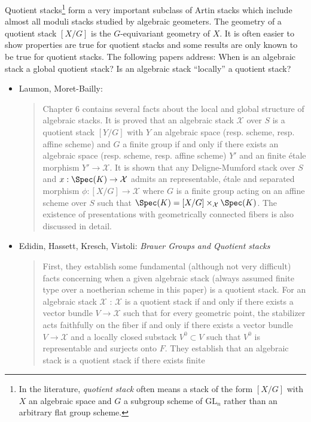 \noindent
Quotient stacks\footnote{In the literature,
\emph{quotient stack} often means a stack of the
form $[X/G]$ with $X$ an algebraic space and $G$ a subgroup scheme
of $\text{GL}_n$ rather than an arbitrary flat group scheme.}
form a very important subclass of Artin stacks which include almost all moduli
stacks studied by algebraic geometers. The geometry of a quotient stack
$[X/G]$ is the $G$-equivariant geometry of $X$. It is often easier to show
properties are true for quotient stacks and some results are only known to be
true for quotient stacks. The following papers address: When is an algebraic
stack a global quotient stack? Is an algebraic stack ``locally'' a quotient
stack?
\begin{itemize}
\item Laumon, Moret-Bailly: \cite[Chapter 6]{LM-B}
\begin{quote}
Chapter 6 contains several facts about the local and global structure of
algebraic stacks. It is proved that an algebraic stack $\mathcal{X}$ over $S$
is a
quotient stack $[Y/G]$ with $Y$ an algebraic space (resp. scheme, resp. affine
scheme) and $G$ a finite group if and only if there exists an algebraic space
(resp. scheme, resp. affine scheme) $Y'$ and an finite \'etale morphism $Y'
\to \mathcal{X}$. It is shown that any Deligne-Mumford stack over $S$ and
$x : \Spec(K) \to \mathcal{X}$ admits an representable, \'etale and
separated morphism $\phi : [X/G] \to \mathcal{X}$ where $G$ is a finite group
acting on an affine scheme over $S$ such
that $\Spec(K) = [X/G] \times_\mathcal{X} \Spec(K)$.
The existence of presentations
with geometrically connected fibers is also discussed in detail.
\end{quote}
\item
Edidin, Hassett, Kresch, Vistoli:
\emph{Brauer Groups and Quotient stacks} \cite{ehkv}
\begin{quote}
First, they establish some fundamental (although not very difficult)
facts concerning
when a given algebraic stack (always assumed finite type over a noetherian
scheme in this paper) is a quotient stack. For an algebraic stack
$\mathcal{X}$ : $\mathcal{X}$ is a quotient stack if and only if
there exists a vector bundle $V \to \mathcal{X}$ such that for every
geometric point, the stabilizer acts faithfully on the fiber
if and only if there exists a vector bundle $V \to \mathcal{X}$ and
a locally closed substack
$V^0 \subset V$ such that $V^0$ is representable and surjects onto $F$. They
establish that an algebraic stack is a quotient stack if there exists finite

\end{quote}
\end{itemize}
